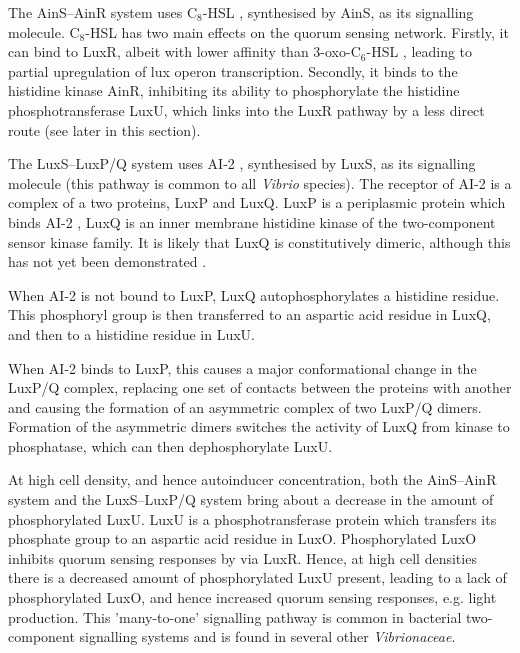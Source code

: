 The AinS–AinR system uses C$_8$-HSL , synthesised by AinS, as its signalling molecule\cite{Lupp2003, Miyashiro2012,Gilson1995}. C$_8$-HSL  has two main effects on the quorum sensing network. Firstly, it can bind to LuxR\cite{Schaefer1996}, albeit with lower affinity than 3-oxo-C$_6$-HSL , leading to partial upregulation of lux operon transcription.
Secondly, it binds to the histidine kinase AinR, inhibiting its ability to phosphorylate the histidine phosphotransferase LuxU, which links into the LuxR pathway by a less direct route (see later in this section)\cite{Timmen2006}.  


The LuxS–LuxP/Q system uses AI-2 , synthesised by LuxS, as its signalling molecule\cite{Miyashiro2012,Neiditch2005,Neiditch2006} (this pathway is common to all \textit{Vibrio} species\cite{Miyashiro2012}). The receptor of AI-2  is a complex of a two proteins, LuxP and LuxQ. LuxP is a periplasmic protein which binds AI-2 , LuxQ is an inner membrane histidine kinase of the two-component sensor kinase family\cite{Bassler1994}. It is likely that LuxQ is constitutively dimeric, although this has not yet been demonstrated \cite{Stock2000}. 

When AI-2  is not bound to LuxP, LuxQ autophosphorylates a histidine residue\cite{Neiditch2006}. This phosphoryl group is then transferred to an aspartic acid residue in LuxQ, and then to a histidine residue in LuxU. 

When AI-2  binds to LuxP, this causes a major conformational change in the LuxP/Q complex, replacing one set of contacts between the proteins with another\cite{Neiditch} and causing the formation of an asymmetric complex of two LuxP/Q dimers. Formation of the asymmetric dimers switches the activity of LuxQ from kinase to phosphatase, which can then dephosphorylate LuxU.

At high cell density, and hence autoinducer concentration, both the AinS–AinR system and the LuxS–LuxP/Q system bring about a decrease in the amount of phosphorylated LuxU. LuxU is a phosphotransferase protein which transfers its phosphate group to an aspartic acid residue in LuxO\cite{Freeman1999}. Phosphorylated LuxO inhibits quorum sensing responses by via LuxR. Hence, at high cell densities there is a decreased amount of phosphorylated LuxU present, leading to a lack of phosphorylated LuxO, and hence increased quorum sensing responses, e.g. light production. This 'many-to-one' signalling pathway is common in bacterial two-component signalling systems \cite{Laub2007} and is found in several other \textit{Vibrionaceae}\cite{Milton2006}.

